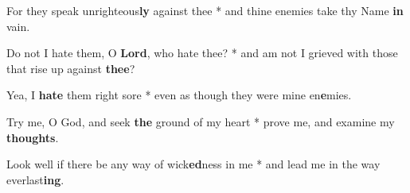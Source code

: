 \begin{multicols}{2}
	For they speak unrighteous\textbf{ly} against thee * and thine enemies take thy Name \textbf{in} vain.
	
	Do not I hate them, O \textbf{Lord}, who hate thee? * and am not I grieved with those that rise up against \textbf{thee}?
	
	Yea, I \textbf{hate} them right sore * even as though they were mine en\textbf{e}mies.
	
	Try me, O God, and seek \textbf{the} ground of my heart * prove me, and examine my \textbf{thoughts}.
	
	Look well if there be any way of wick\textbf{ed}ness in me * and lead me in the way everlast\textbf{ing}.
\end{multicols}